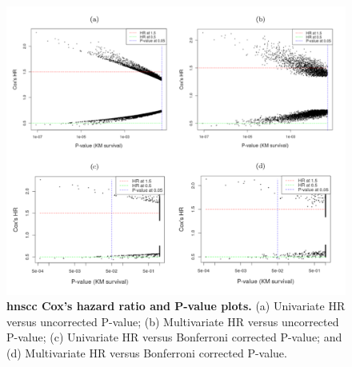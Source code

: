 \documentclass[cancers,article,submit,moreauthors,pdftex]{Definitions/mdpi}
\newcommand{\bcaption}[2]{\caption{\textbf{#1} #2}}
\begin{document}
\begin{figure}[hp]
\centering
\includegraphics[width=\textwidth]{Figure2.pdf}
\bcaption{\acrshort{hnscc} Cox's hazard ratio and P-value plots.}
{(a) Univariate HR versus uncorrected P-value; (b) Multivariate HR versus uncorrected P-value; (c) Univariate HR versus Bonferroni corrected P-value; and (d) Multivariate HR versus Bonferroni corrected P-value.}
\label{fig:figure2}
\end{figure}
\end{document}
